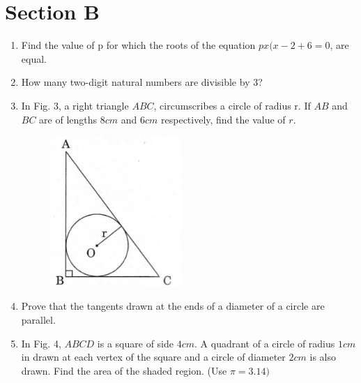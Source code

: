 \documentclass[journal,12pt,twocolumn]{IEEEtran}
\renewcommand\thesection{\arabic{section}}
\begin{document}
\section{Section B}
\renewcommand{\theequation}{\theenumi}
\begin{enumerate}[label=\thesection.\arabic*.,ref=\thesection.\theenumi]
\item Find the value of p for which the roots of the equation $px(x-2+6=0$, are equal.\\
\item How many two-digit natural numbers are divisible by 3?\\
\item In Fig. 3, a right triangle $ABC$, circumscribes a circle of radius r. If $AB$ and $BC$ are of lengths $8cm$ and $6cm$ respectively, find the value of $r$. \\

\begin{figure}[h!]
    \centering
    \includegraphics[width=5cm]{3.png}
 \end{figure}
\item Prove that the tangents drawn at the ends of a diameter of a circle are parallel.\\
\item In Fig. 4, $ABCD$ is a square of side $4 cm$. A quadrant of a circle of radius $1 cm$ in drawn at each vertex of the square and a circle of diameter $2 cm$ is also drawn. Find the area of the shaded region. (Use $\pi = 3.14)$\\


\end{enumerate}
\end{document}
